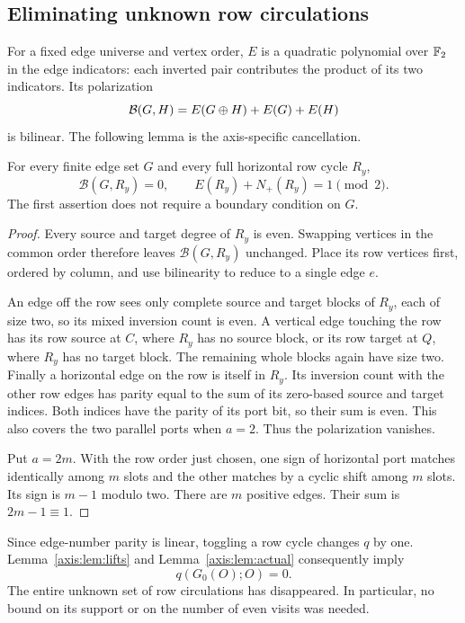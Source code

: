 \subsection{Eliminating unknown row circulations}\label{axis:sec:radical}
For a fixed edge universe and vertex order, $E$ is a quadratic polynomial over
$\mathbb F_2$ in the edge indicators: each inverted pair contributes the product of
its two indicators. Its polarization
\[
 \mathcal B(G,H)=E(G\mathbin{\oplus} H)+E(G)+E(H)
\]
is bilinear. The following lemma is the axis-specific cancellation.

\begin{lemma}\label{axis:lem:radical}
For every finite edge set $G$ and every full horizontal row cycle $R_y$,
\[
 \mathcal B(G,R_y)=0,\qquad E(R_y)+N_+(R_y)=1\pmod2.
\]
The first assertion does not require a boundary condition on $G$.
\end{lemma}
\begin{proof}
Every source and target degree of $R_y$ is even. Swapping vertices in the
common order therefore leaves $\mathcal B(G,R_y)$ unchanged. Place its row
vertices first, ordered by column, and use bilinearity to reduce to a single
edge $e$.

An edge off the row sees only complete source and target blocks of $R_y$,
each of size two, so its mixed inversion count is even. A vertical edge
touching the row has its row source at $C$, where $R_y$ has no source block,
or its row target at $Q$, where $R_y$ has no target block. The remaining
whole blocks again have size two. Finally a horizontal edge on the row is
itself in $R_y$. Its inversion count with the other row edges has parity equal
to the sum of its zero-based source and target indices. Both indices have
the parity of its port bit, so their sum is even. This also covers the two
parallel ports when $a=2$. Thus the polarization vanishes.

Put $a=2m$. With the row order just chosen, one sign of horizontal port
matches identically among $m$ slots and the other matches by a cyclic shift
among $m$ slots. Its sign is $m-1$ modulo two. There are $m$ positive edges.
Their sum is $2m-1\equiv1$.
\end{proof}

Since edge-number parity is linear, toggling a row cycle changes $q$ by one.
Lemma~\ref{axis:lem:lifts} and Lemma~\ref{axis:lem:actual} consequently imply
\begin{equation}\label{axis:eq:q0zero}
 q(G_0(O);O)=0.
\end{equation}
The entire unknown set of row circulations has disappeared. In particular,
no bound on its support or on the number of even visits was needed.


